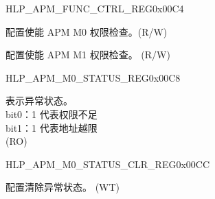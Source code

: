 \begin{register}{H}{LP\_APM\_FUNC\_CTRL\_REG}{0x00C4}\label{regdesc:LPAPMFUNCCTRLREG}
%
%
%
\regnewline%
\begin{regdesc}\begin{reglist}
\label{fielddesc:LPAPMM0FUNCEN}\item [LP\_APM\_M0\_FUNC\_EN] 配置使能 APM M0 权限检查。(R/W)
\label{fielddesc:LPAPMM1FUNCEN}\item [LP\_APM\_M1\_FUNC\_EN] 配置使能 APM M1 权限检查。 (R/W)
\end{reglist}\end{regdesc}
\end{register}


\begin{register}{H}{LP\_APM\_M0\_STATUS\_REG}{0x00C8}\label{regdesc:LPAPMM0STATUSREG}
%
%
\regnewline%
\begin{regdesc}\begin{reglist}
\label{fielddesc:LPAPMM0EXCEPTIONSTATUS}\item [LP\_APM\_M0\_EXCEPTION\_STATUS] 表示异常状态。\\ 
bit0：1 代表权限不足 \\
bit1：1 代表地址越限  \\ (RO)
\end{reglist}\end{regdesc}
\end{register}


\begin{register}{H}{LP\_APM\_M0\_STATUS\_CLR\_REG}{0x00CC}\label{regdesc:LPAPMM0STATUSCLRREG}
%
%
\regnewline%
\begin{regdesc}\begin{reglist}
\label{fielddesc:LPAPMM0REGIONSTATUSCLR}\item [LP\_APM\_M0\_REGION\_STATUS\_CLR] 配置清除异常状态。 (WT)
\end{reglist}\end{regdesc}
\end{register}


